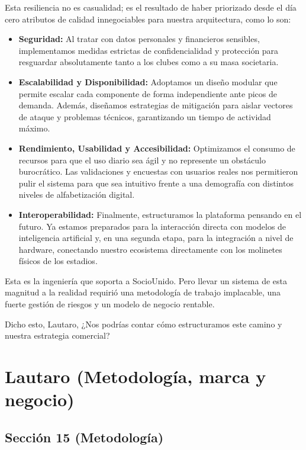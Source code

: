 Esta resiliencia no es casualidad; es el resultado de haber priorizado desde el día cero atributos de calidad innegociables para nuestra arquitectura, como lo son:
\begin{itemize}
    \item \textbf{Seguridad:} Al tratar con datos personales y financieros sensibles, implementamos medidas estrictas de confidencialidad y protección para resguardar absolutamente tanto a los clubes como a su masa societaria.
    \item \textbf{Escalabilidad y Disponibilidad:} Adoptamos un diseño modular que permite escalar cada componente de forma independiente ante picos de demanda. Además, diseñamos estrategias de mitigación para aislar vectores de ataque y problemas técnicos, garantizando un tiempo de actividad máximo.
    \item \textbf{Rendimiento, Usabilidad y Accesibilidad:} Optimizamos el consumo de recursos para que el uso diario sea ágil y no represente un obstáculo burocrático. Las validaciones y encuestas con usuarios reales nos permitieron pulir el sistema para que sea intuitivo frente a una demografía con distintos niveles de alfabetización digital.
    \item \textbf{Interoperabilidad:} Finalmente, estructuramos la plataforma pensando en el futuro. Ya estamos preparados para la interacción directa con modelos de inteligencia artificial y, en una segunda etapa, para la integración a nivel de hardware, conectando nuestro ecosistema directamente con los molinetes físicos de los estadios.
\end{itemize}

Esta es la ingeniería que soporta a SocioUnido. Pero llevar un sistema de esta magnitud a la realidad requirió una metodología de trabajo implacable, una fuerte gestión de riesgos y un modelo de negocio rentable.

Dicho esto, Lautaro, ¿Nos podrías contar cómo estructuramos este camino y nuestra estrategia comercial?

\newpage

\section{Lautaro (Metodología, marca y negocio)}

\subsection{Sección 15 (Metodología)}

